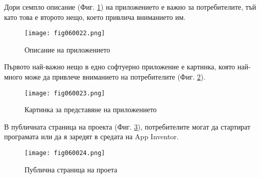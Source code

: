 Дори семпло описание (Фиг. \ref{fig060022}) на приложението е важно за потребителите, тъй като това е второто нещо, което привлича вниманието им.

\begin{figure}[H]
  \centering
  \texttt{[image: fig060022.png]}
  \caption{Описание на приложението}
\label{fig060022}
\end{figure}

Първото най-важно нещо в едно софтуерно приложение е картинка, която най-много може да привлече вниманието на потребителите (Фиг. \ref{fig060023}).

\begin{figure}[H]
  \centering
  \texttt{[image: fig060023.png]}
  \caption{Картинка за представяне на приложението}
\label{fig060023}
\end{figure}

В публичната страница на проекта (Фиг. \ref{fig060024}), потребителите могат да стартират програмата или да я заредят в средата на App Inventor.

\begin{figure}[H]
  \centering
  \texttt{[image: fig060024.png]}
  \caption{Публична страница на проета}
\label{fig060024}
\end{figure}

